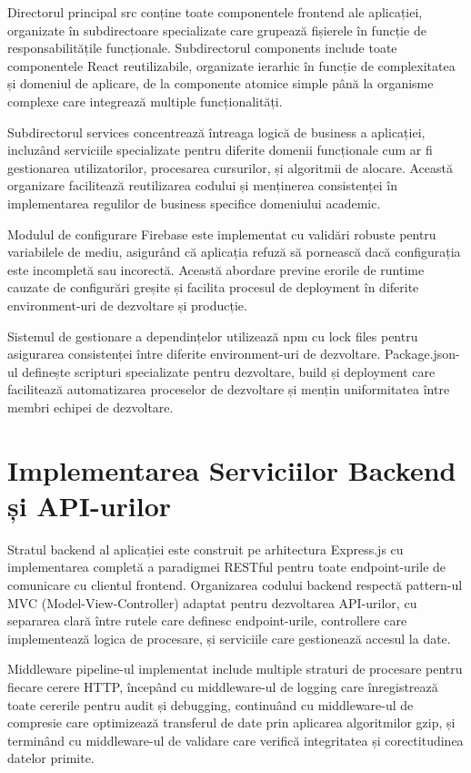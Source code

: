 \documentclass[12pt,a4paper]{report}
\begin{document}
Directorul principal src conține toate componentele frontend ale aplicației, organizate în subdirectoare specializate care grupează fișierele în funcție de responsabilitățile funcționale. Subdirectorul components include toate componentele React reutilizabile, organizate ierarhic în funcție de complexitatea și domeniul de aplicare, de la componente atomice simple până la organisme complexe care integrează multiple funcționalități.

Subdirectorul services concentrează întreaga logică de business a aplicației, incluzând serviciile specializate pentru diferite domenii funcționale cum ar fi gestionarea utilizatorilor, procesarea cursurilor, și algoritmii de alocare. Această organizare facilitează reutilizarea codului și menținerea consistenței în implementarea regulilor de business specifice domeniului academic.

Modulul de configurare Firebase este implementat cu validări robuste pentru variabilele de mediu, asigurând că aplicația refuză să pornească dacă configurația este incompletă sau incorectă. Această abordare previne erorile de runtime cauzate de configurări greșite și facilita procesul de deployment în diferite environment-uri de dezvoltare și producție.

Sistemul de gestionare a dependințelor utilizează npm cu lock files pentru asigurarea consistenței între diferite environment-uri de dezvoltare. Package.json-ul definește scripturi specializate pentru dezvoltare, build și deployment care facilitează automatizarea proceselor de dezvoltare și mențin uniformitatea între membri echipei de dezvoltare.

\section{Implementarea Serviciilor Backend și API-urilor}

Stratul backend al aplicației este construit pe arhitectura Express.js cu implementarea completă a paradigmei RESTful \cite{rest-api} pentru toate endpoint-urile de comunicare cu clientul frontend. Organizarea codului backend respectă pattern-ul MVC (Model-View-Controller) \cite{mvc-pattern} adaptat pentru dezvoltarea API-urilor, cu separarea clară între rutele care definesc endpoint-urile, controllere care implementează logica de procesare, și serviciile care gestionează accesul la date.

Middleware pipeline-ul implementat include multiple straturi de procesare pentru fiecare cerere HTTP, începând cu middleware-ul de logging care înregistrează toate cererile pentru audit și debugging, continuând cu middleware-ul de compresie care optimizează transferul de date prin aplicarea algoritmilor gzip, și terminând cu middleware-ul de validare care verifică integritatea și corectitudinea datelor primite.
\end{document}
